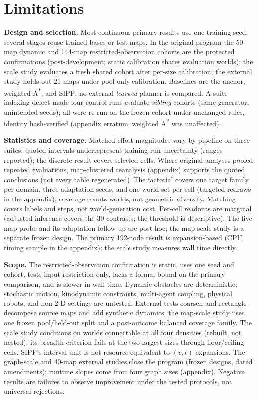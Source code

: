 \documentclass[letterpaper]{article} %
\begin{document}
\section{Limitations}

 \textbf{Design and selection.} Most continuous primary results use one training seed; several stages reuse trained bases or test maps. In the original program the 50-map dynamic and 144-map restricted-observation cohorts are the protected confirmations (post-development; static calibration shares evaluation worlds); the scale study evaluates a fresh shared cohort after per-size calibration; the external study holds out 21 maps under pool-only calibration. Baselines are the anchor, weighted A\textsuperscript{*}, and SIPP; no external \emph{learned} planner is compared. A suite-indexing defect made four control runs evaluate \emph{sibling} cohorts (same-generator, unintended seeds); all were re-run on the frozen cohort under unchanged rules, identity hash-verified (appendix erratum; weighted A\textsuperscript{*} was unaffected).

 \textbf{Statistics and coverage.} Matched-effort magnitudes vary by pipeline on three suites; quoted intervals underrepresent training-run uncertainty (ranges reported); the discrete result covers selected cells. Where original analyses pooled repeated evaluations, map-clustered reanalysis (appendix) supports the quoted conclusions (not every table regenerated). The factorial covers one target family per domain, three adaptation seeds, and one world set per cell (targeted redraws in the appendix); coverage counts worlds, not geometric diversity. Matching covers labels and steps, not world-generation cost. Per-cell readouts are marginal (adjusted inference covers the 30 contrasts; the threshold is descriptive). The five-map probe and its adaptation follow-up are post hoc; the map-scale study is a separate frozen design. The primary 192-node result is expansion-based (CPU timing sample in the appendix); the scale study measures wall time directly.

 \textbf{Scope.} The restricted-observation confirmation is static, uses one seed and cohort, tests input restriction only, lacks a formal bound on the primary comparison, and is slower in wall time. Dynamic obstacles are deterministic; stochastic motion, kinodynamic constraints, multi-agent coupling, physical robots, and non-2-D settings are untested. External tests coarsen and rectangle-decompose source maps and add synthetic dynamics; the map-scale study uses one frozen pool/held-out split and a post-outcome balanced coverage family. The scale study conditions on worlds connectable at all four densities (rebuilt, not nested); its breadth criterion fails at the two largest sizes through floor/ceiling cells. SIPP's interval unit is not resource-equivalent to $(v,t)$ expansions. The graph-scale and 40-map external studies close the program (frozen designs, dated amendments); runtime slopes come from four graph sizes (appendix). Negative results are failures to observe improvement under the tested protocols, not universal rejections.
\end{document}

